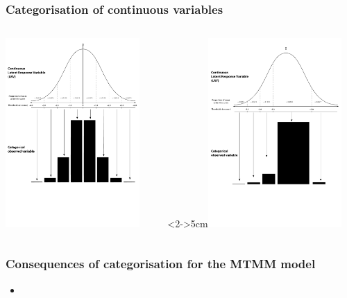 \documentclass{beamer}
\begin{document}
\begin{frame}
	\frametitle{Categorisation of continuous variables}	 
    \begin{columns}[T]
    	\begin{column}{5cm}\includegraphics[width=5.1cm]{i/LRV-8cat.pdf}\end{column}
    	\begin{column}<2->{5cm}\includegraphics[width=5.1cm]{i/LRV-skew.pdf}
    	\end{column}
    \end{columns}
\end{frame}

\begin{frame}
\frametitle{Consequences of categorisation for the MTMM model}

	\begin{itemize}
		\item 
	\end{itemize}
 
\end{frame}
\end{document}
